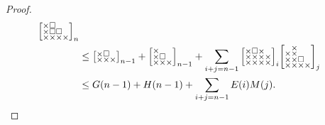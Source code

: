 \documentclass[a4paper,12pt]{article}
\makeatletter
\newenvironment{grid}
  {\begingroup\footnotesize
   \renewcommand{\arraystretch}{0}
   \setlength{\arraycolsep}{0pt}
   \left[\begin{array}{@{}*{10}{c}@{}}}
  {\end{array}\right]\endgroup}
\newcommand{\void}{\phantom{\times}}
\makeatother
\begin{document}
\begin{proof}
\begin{align*}
\begin{grid}
        \times & \square & \void & \void \\
        \times & \square & \square & \void \\
        \times & \times & \times & \times
    \end{grid}_n \\
    &\le \begin{grid}
        \times & \square & \void\\
        \times & \times & \times
    \end{grid}_{n-1} + \begin{grid}
        \times & \void & \void \\
        \times & \square & \void \\
        \times & \times & \times
    \end{grid}_{n-1} + \sum_{i+j=n-1} \begin{grid}
        \times & \square & \times & \void \\
        \times & \times & \times & \times \\
        \times & \times & \times & \times
    \end{grid}_i \begin{grid}
        \void & \times & \void & \void \\
        \times & \times & \void & \void \\
        \times & \times & \square & \void \\
        \times & \times & \times & \times
    \end{grid}_j \\
    &\le G(n-1) + H(n-1) + \sum_{i+j=n-1} E(i) M(j).\qedhere
\end{align*}
\end{proof}
\end{document}
